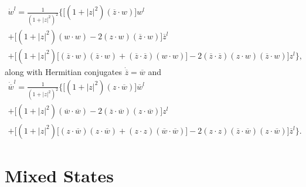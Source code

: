 \begin{multline}
    \dot{w}^l = \frac{1}{ \left( 1 + \left| z\right|^2 \right)^2 }
        \biggl\lbrace
            \biggl[ \left( 1 + \left| z\right|^2 \right) 
                    \left( \overline{z}\cdot w \right)
            \biggr] w^l\\
            +
            \biggl[ \left( 1 + \left| z\right|^2 \right)\left( w\cdot w \right)
                    - 2\left( z\cdot w \right)\left( \overline{z}\cdot w \right)
            \biggr] \overline{z}^l\\
            +
            \biggl[ \left( 1 + \left| z\right|^2 \right) 
                    \bigl[ 
                      \left(\overline{z}\cdot w\right)\left(\overline{z}\cdot w\right)
                      +\left(\overline{z}\cdot\overline{z}\right)\left(w\cdot w\right)
                    \bigr]
                    - 2\left(\overline{z}\cdot\overline{z}\right) 
                        \left( z\cdot w \right)\left( \overline{z}\cdot w \right)
            \biggr] z^l
        \biggr\rbrace,
\end{multline}
along with Hermitian conjugates $\dot{\overline{z}}=\overline{w}$ and 
\begin{multline}
    \dot{\overline{w}}^l = \frac{1}{ \left( 1 + \left| z\right|^2 \right)^2 }
        \biggl\lbrace
            \biggl[ \left( 1 + \left| z\right|^2 \right) 
                    \left( z\cdot \overline{w} \right)
            \biggr] \overline{w}^l\\
            +
            \biggl[ \left( 1 + \left| z\right|^2 \right)\left( 
                            \overline{w}\cdot \overline{w} \right)
                    - 2\left( \overline{z}\cdot \overline{w} \right)
                        \left( z\cdot \overline{w} \right)
            \biggr] z^l\\
            +
            \biggl[ \left( 1 + \left| z\right|^2 \right) 
                    \bigl[ 
                      \left(z\cdot \overline{w}\right)\left(z\cdot \overline{w}\right)
                      +\left(z\cdot z\right)\left(\overline{w}\cdot\overline{w}\right)
                    \bigr]
                    - 2\left(z\cdot z\right) 
                        \left( \overline{z}\cdot \overline{w} \right)
                        \left( z\cdot \overline{w} \right)
            \biggr] \overline{z}^l
        \biggr\rbrace.
\end{multline}


\section{Mixed States}


